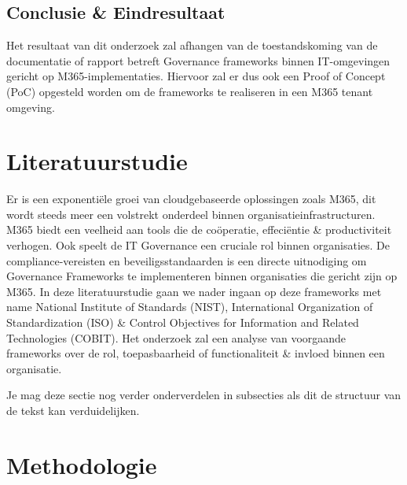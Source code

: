 \subsection{Conclusie \& Eindresultaat}
Het resultaat van dit onderzoek zal afhangen van de toestandskoming van de documentatie of rapport betreft Governance frameworks binnen IT-omgevingen gericht op M365-implementaties. Hiervoor zal er dus ook een Proof of Concept (PoC) opgesteld worden om de frameworks te realiseren in een M365 tenant omgeving.



\section{Literatuurstudie}%
\label{sec:Literatuurstudie}

Er is een exponentiële groei van cloudgebaseerde oplossingen zoals M365, dit wordt steeds meer een volstrekt onderdeel binnen organisatieinfrastructuren. M365 biedt een veelheid aan tools die de coöperatie, effeciëntie \& productiviteit verhogen. Ook speelt de IT Governance een cruciale rol binnen organisaties. De compliance-vereisten en beveiligsstandaarden is een directe uitnodiging om Governance Frameworks te implementeren binnen organisaties die gericht zijn op M365.
In deze literatuurstudie gaan we nader ingaan op deze frameworks met name National Institute of Standards (NIST), International Organization of Standardization (ISO) \& Control Objectives for Information and Related Technologies (COBIT). Het onderzoek zal een analyse van voorgaande frameworks over de rol, toepasbaarheid of functionaliteit \& invloed binnen een organisatie.


Je mag deze sectie nog verder onderverdelen in subsecties als dit de structuur van de tekst kan verduidelijken.

\section{Methodologie}%
\label{sec:methodologie}

